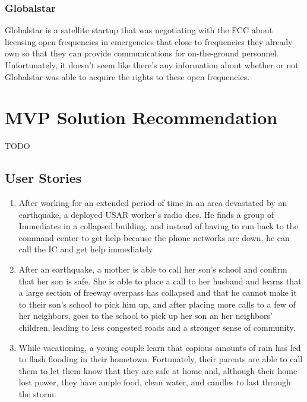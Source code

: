 \documentclass[10pt]{article}
\begin{document}
\subsubsection*{Globalstar}
Globalstar is a satellite startup that was negotiating with the FCC about
licensing open frequencies in emergencies that close to frequencies they already
own so that they can provide communications for on-the-ground personnel.
Unfortunately, it doesn't seem like there's any information about whether or not
Globalstar was able to acquire the rights to these open frequencies.

\subsubsection*{}

\section{MVP Solution Recommendation}
TODO

\subsection*{User Stories}
\begin{enumerate}
    \item After working for an extended period of time in an area devastated by
        an earthquake, a deployed USAR worker's radio dies.  He finds a group of
        Immediates in a collapsed building, and instead of having to run back to
        the command center to get help because the phone networks are down, he
        can call the IC and get help immediately
    \item After an earthquake, a mother is able to call her son's school and
        confirm that her son is safe.  She is able to place a call to her
        husband and learns that a large section of freeway overpass has
        collapsed and that he cannot make it to their son's school to pick him
        up, and after placing more calls to a few of her neighbors, goes to the
        school to pick up her son an her neighbors' children, leading to less
        congested roads and a stronger sense of community.
    \item While vacationing, a young couple learn that copious amounts of rain
        has led to flash flooding in their hometown.  Fortunately, their parents
        are able to call them to let them know that they are safe at home and,
        although their home lost power, they have ample food, clean water, and
        candles to last through the storm.
\end{enumerate}
\end{document}
